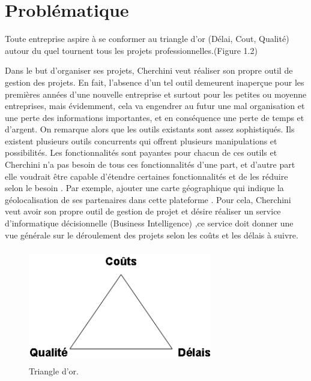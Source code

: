 \section{ Probl\'{e}matique }
Toute entreprise aspire \`{a} se conformer au triangle d'or (D\'{e}lai, Cout, Qualit\'{e})
autour du quel tournent tous les projets professionnelles.(Figure 1.2)


Dans le but d'organiser ses projets, Cherchini veut r\'{e}aliser son propre outil de
gestion des projets.\newline
En fait, l'absence d'un tel outil demeurent inaper\c{c}ue
pour les premi\`{e}res ann\'{e}es d'une nouvelle entreprise et surtout pour les
petites ou moyenne entreprises, mais \'{e}videmment, cela va engendrer au futur
une mal organisation et une perte des informations importantes, et en
cons\'{e}quence une perte de temps et d'argent. \newline
On remarque alors que les outils existants sont assez sophistiqu\'{e}s.\newline
Ils existent plusieurs outils concurrents qui offrent
plusieurs manipulations et possibilit\'{e}s. \newline
Les fonctionnalit\'{e}s sont payantes pour chacun de ces outils et Cherchini n'a
pas besoin de tous ces fonctionnalit\'{e}s d'une part, et d'autre part elle voudrait
\^{e}tre capable d'\'{e}tendre certaines fonctionnalit\'{e}s et de les r\'{e}duire selon le
besoin . \newline
Par exemple, ajouter une carte g\'{e}ographique qui indique la g\'{e}olocalisation de ses partenaires dans cette plateforme . \newline
Pour cela, Cherchini veut avoir son propre outil de gestion de projet et d\'{e}sire r\'{e}aliser un
service d'informatique d\'{e}cisionnelle (Business Intelligence) ,ce service doit donner une vue g\'{e}n\'{e}rale sur le d\'{e}roulement des projets
selon les co\^{u}ts et les d\'{e}lais \`{a} suivre.


\begin{figure}[H]
\center
\includegraphics[width=8cm,height=5cm]{./figures/triangle.png}
\caption{Triangle d'or.}
\end{figure}




